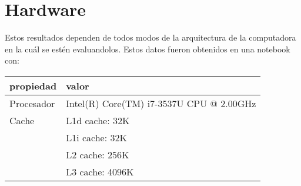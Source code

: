 \documentclass[11pt]{article}
\begin{document}
\section{Hardware}
\label{sec-3}
Estos resultados dependen de todos modos de la arquitectura de la
computadora en la cuál se estén evaluandolos. 
Estos datos fueron obtenidos en una notebook con:

\begin{center}
\begin{tabular}{ll}
propiedad & valor\\
\hline
Procesador & Intel(R) Core(TM) i7-3537U CPU @ 2.00GHz\\
Cache & L1d cache: 32K\\
 & L1i cache:             32K\\
 & L2 cache:              256K\\
 & L3 cache:              4096K\\
\end{tabular}
\end{center}
\end{document}

